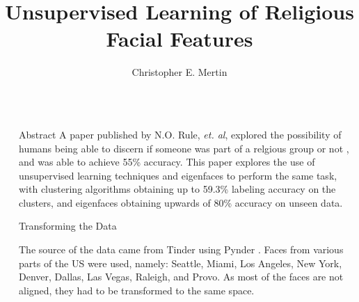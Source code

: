 \documentclass[final]{beamer}
\title{Unsupervised Learning of Religious Facial Features} %
\author{Christopher E. Mertin} %
\institute{School of Computing, University of Utah} %
\newlength{\sepwid}
\newlength{\onecolwid}
\begin{document}

\setlength{\belowcaptionskip}{2ex} %
\setlength\belowdisplayshortskip{2ex} %

\begin{frame}[t] %

\begin{columns}[t] %

\begin{column}{\sepwid}\end{column} %

\begin{column}{\onecolwid} %


\begin{alertblock}{Abstract}
A paper published by N.O. Rule, {\em et. al}, explored the possibility of humans being able to discern if someone was part of a relgious group or not \cite{MormonID}, and was able to achieve 55\% accuracy. This paper explores the use of unsupervised learning techniques and eigenfaces to perform the same task, with clustering algorithms obtaining up to 59.3\% labeling accuracy on the clusters, and eigenfaces obtaining upwards of 80\% accuracy on unseen data. 
\end{alertblock}


\begin{block}{Transforming the Data}

The source of the data came from Tinder using Pynder \cite{pynder}. Faces from various parts of the US were used, namely: Seattle, Miami, Los Angeles, New York, Denver, Dallas, Las Vegas, Raleigh, and Provo. As most of the faces are not aligned, they had to be transformed to the same space.


\end{block}
\end{column}
\end{columns}
\end{frame}
\end{document}

